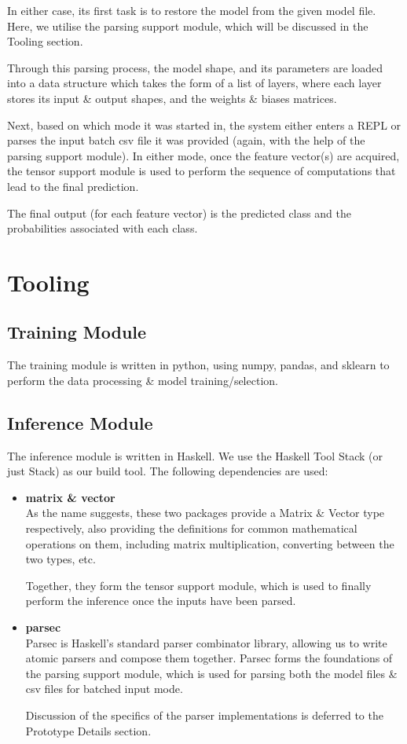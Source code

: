 \documentclass[12pt]{article}
\begin{document}
In either case, its first task is to restore the model from the given model file. Here, we utilise the parsing support module, which will be discussed in the Tooling section.\bigskip

Through this parsing process, the model shape, and its parameters are loaded into a data structure which takes the form of a list of layers, where each layer stores its input \& output shapes, and the weights \& biases matrices.\bigskip

Next, based on which mode it was started in, the system either enters a REPL or parses the input batch csv file it was provided (again, with the help of the parsing support module). In either mode, once the feature vector(s) are acquired, the tensor support module is used to perform the sequence of computations that lead to the final prediction.\bigskip

The final output (for each feature vector) is the predicted class and the probabilities associated with each class.

\section{Tooling}
\subsection{Training Module}
The training module is written in python, using numpy, pandas, and sklearn to perform the data processing \& model training/selection.\bigskip

\subsection{Inference Module}
The inference module is written in Haskell. We use the Haskell Tool Stack (or just Stack) as our build tool. The following dependencies are used:
\begin{itemize}
	\item \textbf{matrix \& vector}\\
	As the name suggests, these two packages provide a Matrix \& Vector type respectively, also providing the definitions for common mathematical operations on them, including matrix multiplication, converting between the two types, etc.\bigskip

	Together, they form the tensor support module, which is used to finally perform the inference once the inputs have been parsed.

	\item \textbf{parsec}\\
	Parsec is Haskell's standard parser combinator library, allowing us to write atomic parsers and compose them together. Parsec forms the foundations of the parsing support module, which is used for parsing both the model files \& csv files for batched input mode.\bigskip

	Discussion of the specifics of the parser implementations is deferred to the Prototype Details section.
\end{itemize}
\end{document}
